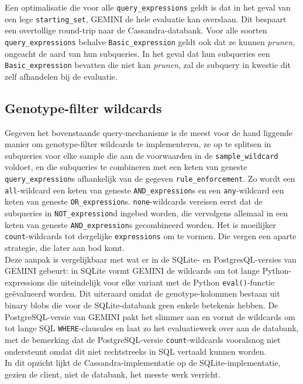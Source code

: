 Een optimalisatie die voor alle \texttt{query\_expressions} geldt is dat in het geval van een lege \texttt{starting\_set}, GEMINI de hele evaluatie kan overslaan. Dit bespaart een overtollige round-trip naar de Cassandra-databank. Voor alle soorten \texttt{query\_expressions} behalve \texttt{Basic\_expression} geldt ook dat ze kunnen \textit{prunen}, ongeacht de aard van hun subqueries. In het geval dat hun subqueries een \texttt{Basic\_expression} bevatten die niet kan \textit{prunen}, zal de subquery in kwestie dit zelf afhandelen bij de evaluatie.

\subsection{Genotype-filter wildcards}
\label{gt_wildcards}

Gegeven het bovenstaande query-mechanisme is de meest voor de hand liggende manier om genotype-filter wildcards te implementeren, ze op te splitsen in subqueries voor elke sample die aan de voorwaarden in de \texttt{sample\_wildcard} voldoet, en die subqueries te combineren met een keten van geneste \texttt{query\_expression}s afhankelijk van de gegeven \texttt{rule\_enforcement}. Zo wordt een \texttt{all}-wildcard een keten van geneste \texttt{AND\_expression}s en een \texttt{any}-wildcard een keten van geneste \texttt{OR\_expression}s. \texttt{none}-wildcards vereisen eerst dat de subqueries in \texttt{NOT\_expression}d ingebed worden, die vervolgens allemaal in een keten van geneste \texttt{AND\_expression}s gecombineerd worden. Het is moeilijker \texttt{count}-wildcards tot dergelijke \texttt{expressions} om te vormen. Die vergen een aparte strategie, die later aan bod komt.\\
Deze aanpak is vergelijkbaar met wat er in de SQLite- en PostgresQL-versies van GEMINI gebeurt: in SQLite vormt GEMINI de wildcards om tot lange Python-expressions die uiteindelijk voor elke variant met de Python \texttt{eval()}-functie ge\"evalueerd worden. Dit uiteraard omdat de genotype-kolommen bestaan uit binary blobs die voor de SQLite-databank geen enkele betekenis hebben. De PostgreSQL-versie van GEMINI pakt het slimmer aan en vormt de wildcards om tot lange SQL \texttt{WHERE}-clausules en laat zo het evaluatiewerk over aan de databank, met de bemerking dat de PostgreSQL-versie \texttt{count}-wildcards vooralsnog niet ondersteunt omdat dit niet rechtstreeks in SQL vertaald kunnen worden.\\
In dit opzicht lijkt de Cassandra-implementatie op de SQLite-implementatie, gezien de client, niet de databank, het meeste werk verricht.\\

